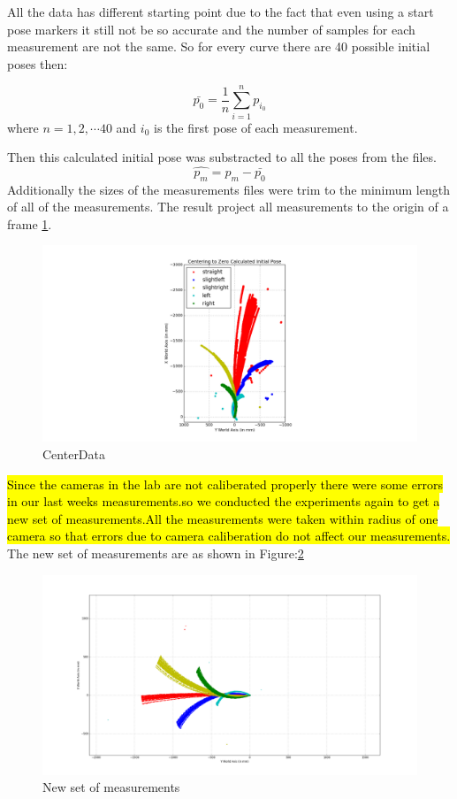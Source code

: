 \documentclass[10pt]{scrartcl}
\begin{document}
All the data has different starting point due to the fact that even using a start pose markers it still not be so accurate and the number of samples for each measurement are not the same. So for every curve there are 40 possible initial poses then:

\[	
	\bar{p_0} = \frac{1}{n} \sum_{i=1}^{n} p_{i_0}
\]
where $n = 1,2,\cdots 40$ and $i_0$ is the first pose of each measurement.

Then this calculated initial pose was substracted to all the poses from the files.
\[	
	\hat{p_m} = p_m - \bar{p_0}
\]
Additionally the sizes of the measurements files were trim to the minimum length of all of the measurements. The result project all measurements to the origin of a frame \ref{fig:preprocess}.

\begin{figure}[H]
\centering
\includegraphics[trim={220 0 0 0},clip,scale=0.5]{images/centerMeasurements}
\caption{CenterData}
\label{fig:preprocess}
\end{figure}

\hl{Since the cameras in the lab are not caliberated properly there were some errors in our last weeks measurements.so we conducted the experiments again to get a new set of measurements.All the measurements were taken within radius of one camera so that errors due to camera caliberation do not affect our measurements. }
The new set of measurements are as shown in Figure:\ref{fig:OriginalData}

\begin{figure}[ht!]
\centering
\includegraphics[scale=0.25]{images/figure_1}
\caption{New set of measurements}
\label{fig:OriginalData}
\end{figure}
\end{document}
